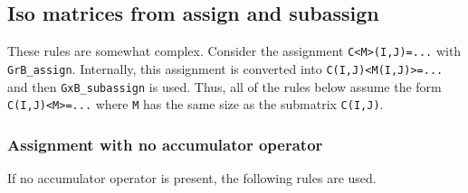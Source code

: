 \documentclass[12pt]{article}
\begin{document}
\subsection{Iso matrices from assign and subassign}
\label{iso_assign}

These rules are somewhat complex.  Consider the assignment \verb'C<M>(I,J)=...'
with \verb'GrB_assign'.  Internally, this assignment is converted into
\verb'C(I,J)<M(I,J)>=...' and then \verb'GxB_subassign' is used.  Thus,
all of the rules below assume the form \verb'C(I,J)<M>=...' where \verb'M'
has the same size as the submatrix \verb'C(I,J)'.

\subsubsection{Assignment with no accumulator operator}

If no accumulator operator is present, the following rules are used.
\end{document}
